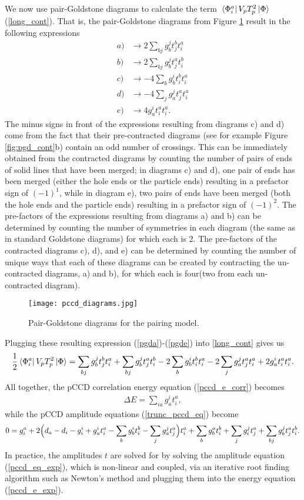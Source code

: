 \documentclass[10pt]{article}
\begin{document}
We now use pair-Goldstone diagrams to calculate the term $\bra*{\Phi^a_i}V_pT^2_p\ket{\Phi}$ (\ref{long_cont}). That is, the pair-Goldstone diagrams from Figure \ref{fig:pgd} result in the following expressions
\begin{align}
\label{pgda}
a) &\to  2\sum_{bj}g^j_bt^b_jt^a_i
\\
b) &\to  2\sum_{bj}g^j_bt^a_jt^b_i
\\
c) &\to -4\sum_{b}g^i_bt^b_it^a_i
\\
d) &\to -4\sum_{j}g^j_at^a_jt^a_i
\\
\label{pgde}
e) &\to  4g^i_at^a_it^a_i
.\end{align}
The minus signs in front of the expressions resulting from diagrams c) and d) come from the fact that their pre-contracted diagrams (see for example Figure \ref{fig:pgd_cont}b) contain an odd number of crossings. This can be immediately obtained from the contracted diagrams by counting the number of pairs of ends of solid lines that have been merged; in diagrams c) and d), one pair of ends has been merged (either the hole ends or the particle ends) resulting in a prefactor sign of $(-1)^1$, while in diagram e), two pairs of ends have been merged (both the hole ends and the particle ends) resulting in a prefactor sign of $(-1)^2$. The pre-factors of the expressions resulting from diagrams a) and b) can be determined by counting the number of symmetries in each diagram (the same as in standard Goldstone diagrams) for which each is 2. The pre-factors of the contracted diagrams c), d), and e) can be determined by counting the number of unique ways that each of these diagrams can be created by contracting the un-contracted diagrams, a) and b), for which each is four(two from each un-contracted diagram).

\begin{figure}[t]
    \centering
    \texttt{[image: pccd\_diagrams.jpg]}
    \caption{Pair-Goldstone diagrams for the pairing model.}
    \label{fig:pgd}
\end{figure}

Plugging these resulting expression (\ref{pgda})-(\ref{pgde}) into \ref{long_cont} gives us
\begin{align}
\frac{1}{2}\bra*{\Phi_i^a}V_pT_p^2\ket{\Phi}
=
\sum_{bj}g^j_bt^b_jt^a_i
+\sum_{bj}g^j_bt^a_jt^b_i
-2\sum_{b}g^i_bt^b_it^a_i
-2\sum_{j}g^j_at^a_jt^a_i
+2g^i_at^a_it^a_i
.\end{align}
All together, the pCCD correlation energy equation (\ref{pccd_e_corr}) becomes
\begin{align}
\label{pccd_e_exp}
\Delta E=\sum_{ia}g_a^it_i^a
,\end{align}
while the pCCD amplitude equations (\ref{trunc_pccd_eq}) become
\begin{align}
\label{pccd_eq_exp}
0=g^a_i+2\Big{(}d_a-d_i-g^i_i+g^i_at^a_i-\sum_bg^i_bt^b_i-\sum_jg^j_at^a_j\Big{)}t^a_i+\sum_bg^a_bt^b_i+\sum_jg^j_it^a_j+\sum_{bj}g^j_bt^a_jt^b_i
.\end{align}
In practice, the amplitudes $t$ are solved for by solving the amplitude equation (\ref{pccd_eq_exp}), which is non-linear and coupled, via an iterative root finding algorithm such as Newton's method and plugging them into the energy equation (\ref{pccd_e_exp}).
\end{document}

